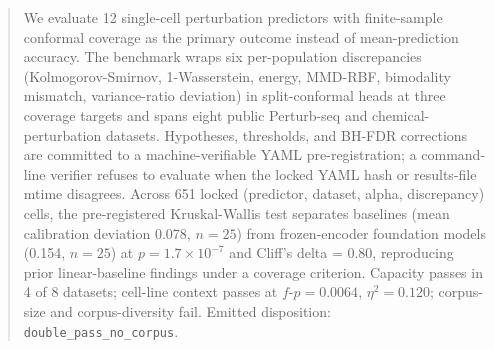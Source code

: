 \documentclass{article}
\begin{document}

\printAffiliationsAndNotice{}

\begin{abstract}
We evaluate 12 single-cell perturbation predictors with finite-sample
conformal coverage as the primary outcome instead of mean-prediction
accuracy. The benchmark wraps six per-population discrepancies
(Kolmogorov-Smirnov, 1-Wasserstein, energy, MMD-RBF, bimodality
mismatch, variance-ratio deviation) in split-conformal heads at three
coverage targets and spans eight public Perturb-seq and
chemical-perturbation datasets. Hypotheses, thresholds, and BH-FDR
corrections are committed to a machine-verifiable YAML
pre-registration; a command-line verifier refuses to evaluate when
the locked YAML hash or results-file mtime disagrees. Across 651
locked (predictor, dataset, alpha, discrepancy) cells, the
pre-registered Kruskal-Wallis test separates baselines (mean
calibration deviation 0.078, $n = 25$) from frozen-encoder foundation
models (0.154, $n = 25$) at $p = 1.7 \times 10^{-7}$ and Cliff's
delta = 0.80, reproducing prior linear-baseline findings
\cite{ahlmann2025deep,csendes2025train} under a coverage criterion.
Capacity passes in 4 of 8 datasets; cell-line context passes at
$f\text{-}p = 0.0064$, $\eta^2 = 0.120$; corpus-size and
corpus-diversity fail. Emitted disposition:
\texttt{double\_pass\_no\_corpus}.
\end{abstract}

\end{document}

